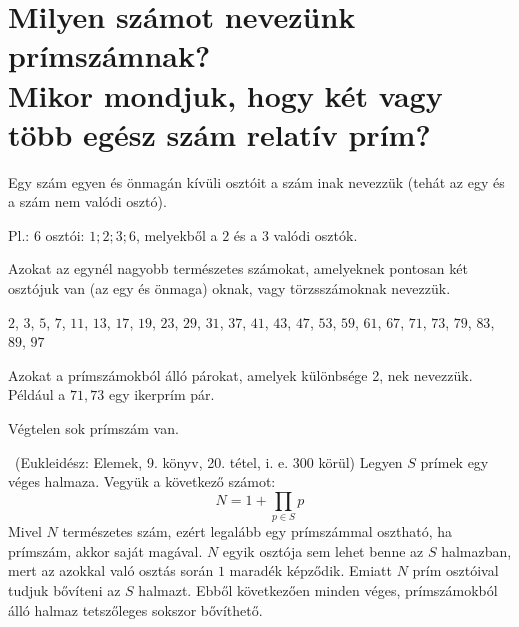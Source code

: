 
\section{Milyen számot nevezünk prímszámnak?
\texorpdfstring{\\}{}Mikor mondjuk, hogy két vagy több egész szám relatív
prím?}
\label{003}

\begin{defin}
Egy szám egyen és önmagán kívüli osztóit a szám inak
nevezzük (tehát az egy és a szám nem valódi osztó).

Pl.: $6$ osztói: $1; 2; 3; 6$, melyekből a $2$ és a $3$ valódi osztók.
\end{defin}

\begin{defin}[Prímszám]
Azokat az egynél nagyobb természetes számokat, amelyeknek pontosan két osztójuk
van (az egy és önmaga) oknak, vagy törzsszámoknak nevezzük.

\end{defin}

\begin{note2} $2$, $3$, $5$, $7$, $11$, $13$,
$17$, $19$, $23$, $29$, $31$, $37$, $41$, $43$, $47$, $53$, $59$, $61$, $67$,
$71$, $73$, $79$, $83$, $89$, $97$
\end{note2}

\begin{defin2}[Ikerprímek]
Azokat a prímszámokból álló párokat, amelyek különbsége 2,
nek nevezzük. Például a $71, 73$ egy ikerprím pár.
\end{defin2}

\begin{theorem}
Végtelen sok prímszám van.
\end{theorem}

\begin{proof3}
\mbox{ }(Eukleidész: Elemek, 9. könyv, 20. tétel, i. e. 300 körül) Legyen $S$
prímek egy véges halmaza. Vegyük a következő számot:
\[
N = 1 + \prod_{p \in S}p
\]
Mivel $N$ természetes szám, ezért legalább egy prímszámmal osztható, ha
prímszám, akkor saját magával. $N$ egyik osztója sem lehet benne az $S$
halmazban, mert az azokkal való osztás során $1$ maradék képződik. Emiatt $N$
prím osztóival tudjuk bővíteni az $S$ halmazt. Ebből következően minden véges,
prímszámokból álló halmaz tetszőleges sokszor bővíthető.
\end{proof3}

